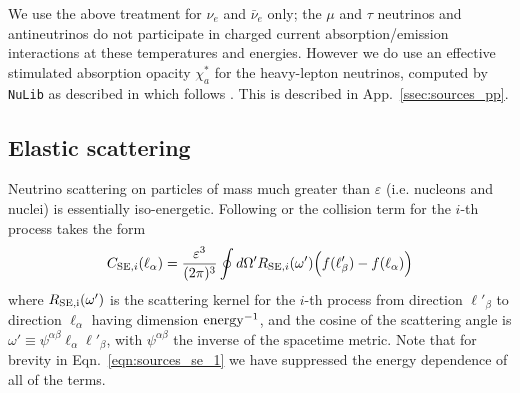 \documentclass[aps,floatfix,prd,superscriptaddress,twocolumn]{revtex4-1}
\begin{document}
We use the above treatment for $\nu_e$ and $\bar{\nu}_e$ only;
the $\mu$ and $\tau$ neutrinos and antineutrinos do not participate in
charged current absorption/emission interactions at these temperatures
and energies.
However we do use an effective stimulated absorption opacity $\chi^*_a$
for the heavy-lepton neutrinos, computed by \lstinline{NuLib} as
described in \cite{ocon2015-gr1d_with_nu} which follows
\cite{brue1985-core_collapse,burr2006-neutrino_opacities}.
This is described in App.~\ref{ssec:sources_pp}.

\subsection{Elastic scattering}
\label{ssec:sources_se}
Neutrino scattering on particles of mass much greater than $\varepsilon$
(i.e. nucleons and nuclei) is essentially iso-energetic. Following 
\cite[Eqn.~A8]{brue1985-core_collapse} or
\cite[Eqn.~4.20]{shib2011-truncated_moment} the collision term for the
$i$-th process takes the form
\begin{equation}
  \label{eqn:sources_se_1}
  C_{{\rm SE},i}(\ell_\alpha)
  = \frac{\varepsilon^3}{(2\pi)^3}
  \oint d\Omega' R_{{\rm SE},i}(\omega')
  \Big(f(\ell'_\beta) - f(\ell_\alpha)\Big)
\end{equation}
where $R_{\rm SE,i}(\omega')$ is the scattering kernel for the $i$-th process
from direction $\ell'_\beta$ to direction $\ell_\alpha$
having dimension ${\rm energy}^{-1}$,
and the cosine of the scattering angle is
$\omega' \equiv \psi^{\alpha\beta}\ell_\alpha\ell'_\beta$, with
$\psi^{\alpha\beta}$ the inverse of the spacetime metric.
Note that for brevity in Eqn.~\ref{eqn:sources_se_1} we have suppressed the
energy dependence of all of the terms.
\end{document}
